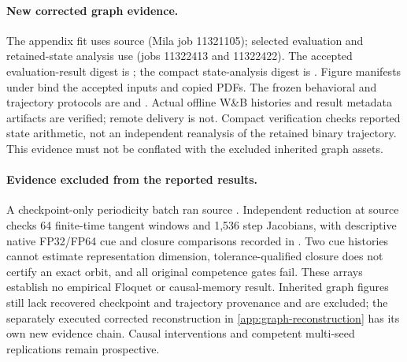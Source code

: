 \paragraph{New corrected graph evidence.}
The appendix fit uses source 
(Mila job 11321105); selected evaluation and retained-state analysis use
(jobs 11322413 and 11322422). The accepted evaluation-result digest is
;
the compact state-analysis digest is
.
Figure manifests under 
bind the accepted inputs and copied PDFs. The frozen behavioral and trajectory
protocols are 
and .
Actual offline W\&B histories and result metadata artifacts are verified;
remote delivery is not. Compact verification checks reported state arithmetic,
not an independent reanalysis of the retained binary trajectory. This evidence
must not be conflated with the excluded inherited graph assets.

\paragraph{Evidence excluded from the reported results.}
A checkpoint-only periodicity batch ran source . Independent reduction at source  checks 64 finite-time tangent windows and 1,536 step Jacobians, with descriptive native FP32/FP64 cue and closure comparisons recorded in . Two cue histories cannot estimate representation dimension, tolerance-qualified closure does not certify an exact orbit, and all original competence gates fail. These arrays establish no empirical Floquet or causal-memory result. Inherited graph figures still lack recovered checkpoint and trajectory provenance and are excluded; the separately executed corrected reconstruction in \cref{app:graph-reconstruction} has its own new evidence chain. Causal interventions and competent multi-seed replications remain prospective.
